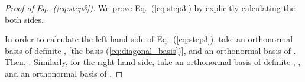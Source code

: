\documentclass[a4paper,12pt]{article}
\providecommand{\eq}[1]{(\ref{eq:#1})}
\begin{document}
\begin{proof}[Proof of Eq.~\eq{step3}]
We prove Eq.~\eq{step3} by explicitly calculating the both sides.

In order to calculate the left-hand side of Eq.~\eq{step3}, take an orthonormal basis of
definite \coordHE{}, \coordHE{} [the basis 
\eq{diagonal_basis}], \coordHE{} and an orthonormal basis of \coordHE{}. Then, \coordHE{}. Similarly, for the right-hand side, take an orthonormal basis of definite
\coordHE{}, \coordHE{}, \coordHE{} and an orthonormal basis of \coordHE{}. 

%
%



\end{proof}
\end{document}
